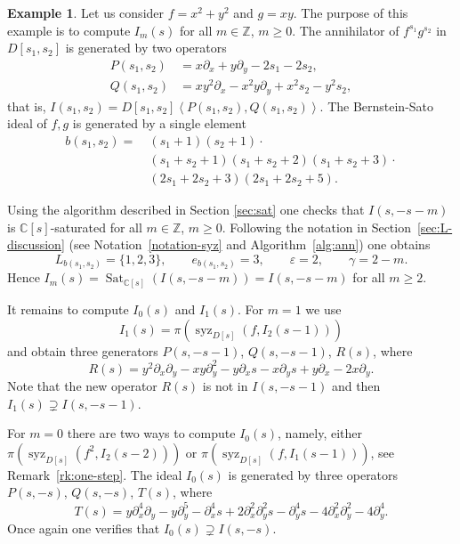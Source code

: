 \documentclass[a4paper,12pt]{amsart}
\theoremstyle{plain}
\theoremstyle{definition}
\newtheorem{ex}[theorem]{Example}
\theoremstyle{remark}
\def\CC{\mathbb{C}}
\def\ZZ{\mathbb{Z}}
\DeclareMathOperator{\Sat}{Sat}
\DeclareMathOperator{\syz}{syz}
\begin{document}
\begin{ex}\label{ex:ann}
Let us consider $f = x^2 + y^2$ and $g = xy$. The purpose of this example is to compute $I_m(s)$ for all $m \in \ZZ$, $m \geq 0$.
The annihilator of $f^{s_1}g^{s_2}$ in $D[s_1,s_2]$ is generated by two operators
\begin{equation}\label{eq:PQ}
\begin{aligned}
P(s_1,s_2) &= x \partial_x + y \partial_y - 2s_1 - 2s_2, \\
Q(s_1,s_2) &= xy^2 \partial_x - x^2y \partial_y + x^2s_2 - y^2 s_2,
\end{aligned}
\end{equation}
that is, $I(s_1,s_2) = D[s_1,s_2] \left\langle P(s_1,s_2), Q(s_1,s_2) \right\rangle$.
The Bernstein-Sato ideal of $f,g$ is generated by a single element
\begin{equation}\label{eq:BS-ideal-x2y2}
\begin{aligned}
b(s_1,s_2)  = \
& (s_1+1) (s_2+1) \cdot \\
& (s_1+s_2+1) (s_1+s_2+2) (s_1+s_2+3)  \cdot  \\
& (2s_1+2s_2+3) (2s_1+2s_2+5).
\end{aligned}
\end{equation}

Using the algorithm described in Section \ref{sec:sat} one checks that $I(s,-s-m)$ is $\CC[s]$-saturated for all $m \in \ZZ$, $m \geq 0$.
Following the notation in Section~\ref{sec:L-discussion} (see Notation~\ref{notation-syz} and Algorithm~\ref{alg:ann}) one obtains
\[
L_{b(s_1,s_2)} = \{1,2,3\}, \qquad e_{b(s_1,s_2)} = 3, \qquad \varepsilon = 2, \qquad \gamma = 2 - m.
\]
Hence $I_m(s) = \Sat_{\CC[s]}(I(s,-s-m)) = I(s,-s-m)$ for all $m \geq 2$.

It remains to compute $I_0(s)$ and $I_1(s)$. For $m=1$ we use
\[
I_1(s) = \pi (\syz_{D[s]}(f,I_2(s-1)))
\]
and obtain three generators $P(s,-s-1)$, $Q(s,-s-1)$, $R(s)$, where
\[
R(s) = y^2 \partial_x \partial_y - x y \partial_y^2 - y \partial_x s - x \partial_y s + y \partial_x - 2x \partial_y.
\]
Note that the new operator $R(s)$ is not in $I(s,-s-1)$ and then $I_1(s) \supsetneq I(s,-s-1)$.

For $m=0$ there are two ways to compute $I_0(s)$, namely, either $\pi (\syz_{D[s]}(f^2,I_2(s-2)))$ or $\pi (\syz_{D[s]}(f,I_1(s-1)))$,
see Remark~\ref{rk:one-step}. The ideal $I_0(s)$ is generated by three operators $P(s,-s)$, $Q(s,-s)$, $T(s)$, where
\[
T(s) = y \partial_x^4 \partial_y - y \partial_y^5 - \partial_x^4 s + 2 \partial_x^2 \partial_y^2 s - \partial_y^4 s - 4 \partial_x^2 \partial_y^2 - 4 \partial_y^4.
\]
Once again one verifies that $I_0(s) \supsetneq I(s,-s)$.
\end{ex}
\end{document}
